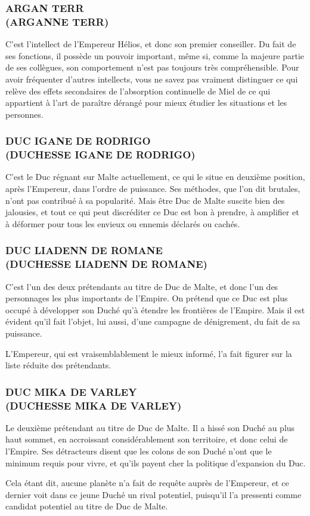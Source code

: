 \documentclass[14pt,twocolumn]{extarticle}
\begin{document}
\subsubsection{ARGAN TERR\\(ARGANNE TERR)}

C'est l'intellect de l'Empereur Hélios, et donc son premier conseiller. Du fait
de ses fonctions, il possède un pouvoir important, même si, comme la majeure
partie de ses collègues, son comportement n'est pas toujours très
compréhensible. Pour avoir fréquenter d'autres intellects, vous ne savez pas
vraiment distinguer ce qui relève des effets secondaires de l'absorption
continuelle de Miel de ce qui appartient à l'art de paraître dérangé pour mieux
étudier les situations et les personnes.

\subsubsection{DUC IGANE DE RODRIGO\\(DUCHESSE IGANE DE RODRIGO)}

C'est le Duc régnant sur Malte actuellement, ce qui le situe en deuxième
position, après l'Empereur, dans l'ordre de puissance. Ses méthodes, que l'on
dit brutales, n'ont pas contribué à sa popularité. Mais être Duc de Malte
suscite bien des jalousies, et tout ce qui peut discréditer ce Duc est bon à
prendre, à amplifier et à déformer pour tous les envieux ou ennemis déclarés ou
cachés.

\subsubsection{DUC LIADENN DE ROMANE\\(DUCHESSE LIADENN DE ROMANE)}

C'est l'un des deux prétendants au titre de Duc de Malte, et donc l'un des
personnages les plus importants de l'Empire. On prétend que ce Duc est plus
occupé à développer son Duché qu'à étendre les frontières de l'Empire. Mais il
est évident qu'il fait l'objet, lui aussi, d'une campagne de dénigrement, du
fait de sa puissance.

L'Empereur, qui est vraisemblablement le mieux informé, l'a fait figurer sur la
liste réduite des prétendants.

\subsubsection{DUC MIKA DE VARLEY\\(DUCHESSE MIKA DE VARLEY)}

Le deuxième prétendant au titre de Duc de Malte. Il a hissé son Duché au plus
haut sommet, en accroissant considérablement son territoire, et donc celui de
l'Empire. Ses détracteurs disent que les colons de son Duché n'ont que le
minimum requis pour vivre, et qu'ils payent cher la politique d'expansion du
Duc.

Cela étant dit, aucune planète n'a fait de requête auprès de l'Empereur, et ce
dernier voit dans ce jeune Duché un rival potentiel, puisqu'il l'a pressenti
comme candidat potentiel au titre de Duc de Malte.
\framebox[\columnwidth]{}
\end{document}
